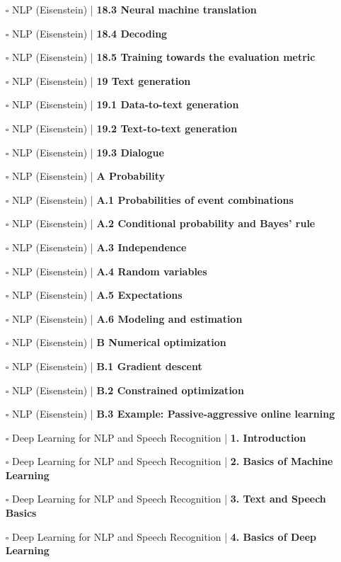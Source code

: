\documentclass[a4, landscape, 12pt]{article}
\newcommand{\checkbox}{$\square$}%
\begin{document}
\begin{itemize}
{}
\item [\checkbox]  NLP (Eisenstein) | \textbf{ 18.3 Neural machine translation
}
\item [\checkbox]  NLP (Eisenstein) | \textbf{ 18.4 Decoding
}
\item [\checkbox]  NLP (Eisenstein) | \textbf{ 18.5 Training towards the evaluation metric
}
\item [\checkbox]  NLP (Eisenstein) | \textbf{ 19 Text generation
}
\item [\checkbox]  NLP (Eisenstein) | \textbf{ 19.1 Data-to-text generation
}
\item [\checkbox]  NLP (Eisenstein) | \textbf{ 19.2 Text-to-text generation
}
\item [\checkbox]  NLP (Eisenstein) | \textbf{ 19.3 Dialogue
}
\item [\checkbox]  NLP (Eisenstein) | \textbf{ A Probability
}
\item [\checkbox]  NLP (Eisenstein) | \textbf{ A.1 Probabilities of event combinations
}
\item [\checkbox]  NLP (Eisenstein) | \textbf{ A.2 Conditional probability and Bayes’ rule
}
\item [\checkbox]  NLP (Eisenstein) | \textbf{ A.3 Independence
}
\item [\checkbox]  NLP (Eisenstein) | \textbf{ A.4 Random variables
}
\item [\checkbox]  NLP (Eisenstein) | \textbf{ A.5 Expectations
}
\item [\checkbox]  NLP (Eisenstein) | \textbf{ A.6 Modeling and estimation
}
\item [\checkbox]  NLP (Eisenstein) | \textbf{ B Numerical optimization
}
\item [\checkbox]  NLP (Eisenstein) | \textbf{ B.1 Gradient descent
}
\item [\checkbox]  NLP (Eisenstein) | \textbf{ B.2 Constrained optimization
}
\item [\checkbox]  NLP (Eisenstein) | \textbf{ B.3 Example: Passive-aggressive online learning
}
\item [\checkbox]  Deep Learning for NLP and Speech Recognition | \textbf{ 1. Introduction
}
\item [\checkbox]  Deep Learning for NLP and Speech Recognition | \textbf{ 2. Basics of Machine Learning
}
\item [\checkbox]  Deep Learning for NLP and Speech Recognition | \textbf{ 3. Text and Speech Basics
}
\item [\checkbox]  Deep Learning for NLP and Speech Recognition | \textbf{ 4. Basics of Deep Learning
}
\end{itemize}
\end{document}
